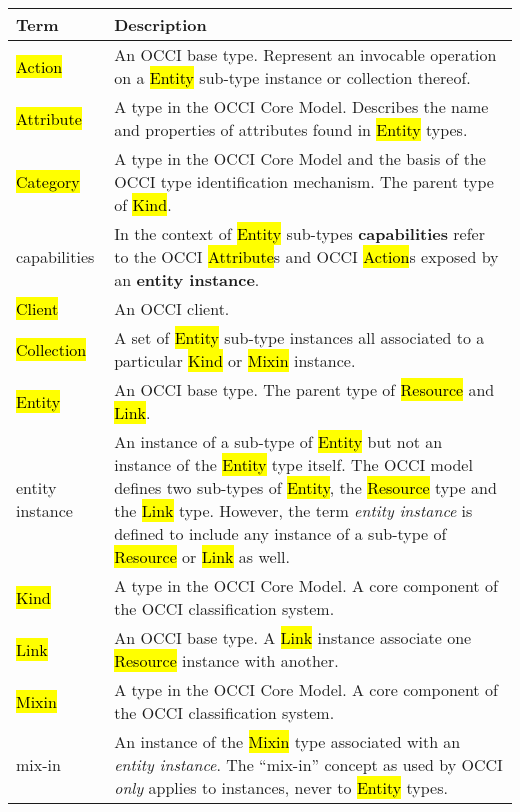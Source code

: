 \begin{tabular}{l|p{12cm}}
Term & Description \\
\hline
\hl{Action} & An OCCI base type. Represent an invocable operation on a \hl{Entity} sub-type instance or collection thereof. \\

\hl{Attribute} & A type in the OCCI Core Model. Describes the name and properties of attributes found in \hl{Entity} types. \\

\hl{Category} & A type in the OCCI Core Model and the basis of the OCCI type identification mechanism. The parent type of \hl{Kind}. \\

capabilities & In the context of \hl{Entity} sub-types {\bf  capabilities} refer
  to the OCCI \hl{Attribute}s and OCCI \hl{Action}s exposed by an {\bf entity
  instance}. \\

\hl{Client} & An OCCI client.\\

\hl{Collection} & A set of \hl{Entity} sub-type instances all associated to a particular \hl{Kind} or \hl{Mixin} instance. \\

\hl{Entity} & An OCCI base type. The parent type of \hl{Resource} and \hl{Link}. \\

entity instance & An instance of a sub-type of \hl{Entity} but not an instance
  of the \hl{Entity} type itself.  The OCCI model defines two sub-types of
  \hl{Entity}, the \hl{Resource} type and the \hl{Link} type.  However, the
  term {\em entity instance} is defined to include any instance of a
  sub-type of \hl{Resource} or \hl{Link} as well. \\

\hl{Kind} & A type in the OCCI Core Model. A core component of the OCCI classification system. \\

\hl{Link} & An OCCI base type. A \hl{Link} instance associate one \hl{Resource} instance with another. \\

\hl{Mixin} & A type in the OCCI Core Model. A core component of the OCCI classification system. \\

mix-in & An instance of the \hl{Mixin} type associated with an {\em entity
 instance}. The ``mix-in'' concept as used by OCCI {\em only} applies to
 instances, never to \hl{Entity} types. \\


\end{tabular}
